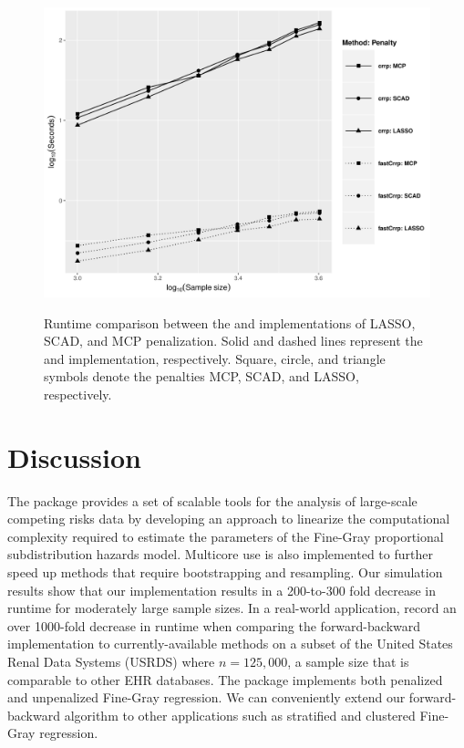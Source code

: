 \begin{figure}[t!]
\centering
\includegraphics[scale = 0.6]{plots/log_PEN-eps-converted-to.pdf}
\label{fig3:pen}
\caption{Runtime comparison between the  and  implementations of LASSO, SCAD, and MCP penalization. Solid and dashed lines represent the  and  implementation, respectively. Square, circle, and triangle symbols denote the penalties MCP, SCAD, and LASSO, respectively.}
\end{figure}

\section{Discussion}
The  package provides a set of scalable tools for the analysis of large-scale competing risks data by developing an approach to linearize the computational complexity required to estimate the parameters of the Fine-Gray proportional subdistribution hazards model. Multicore use is also implemented to further speed up methods that require bootstrapping and resampling. Our simulation results show that our implementation results in a 200-to-300 fold decrease in runtime for moderately large sample sizes. {\color{blue}In a real-world application, \cite{kawaguchi2019scalable} record an over 1000-fold decrease in runtime when comparing the forward-backward implementation to currently-available methods on a subset of the United States Renal Data Systems (USRDS) where $n =125, 000$, a sample size that is comparable to other EHR databases.} The package implements both penalized and unpenalized Fine-Gray regression. We can conveniently extend our forward-backward algorithm to other applications such as stratified and clustered Fine-Gray regression. 

